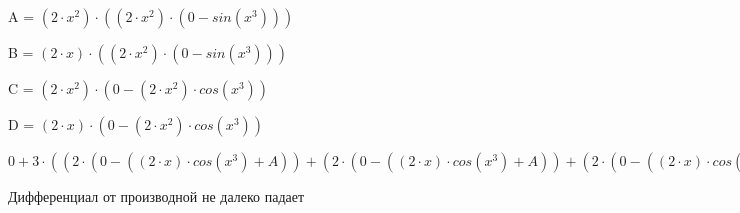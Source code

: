\documentclass[12pt,a4paper,fleqn]{article}
\begin{document}
\begin{center}
A = $(2 \cdot x^{2}) \cdot ((2 \cdot x^{2}) \cdot (0-sin(x^{3})))$\end{center}
\begin{center}
B = $(2 \cdot x) \cdot ((2 \cdot x^{2}) \cdot (0-sin(x^{3})))$\end{center}
\begin{center}
C = $(2 \cdot x^{2}) \cdot (0-(2 \cdot x^{2}) \cdot cos(x^{3}))$\end{center}
\begin{center}
D = $(2 \cdot x) \cdot (0-(2 \cdot x^{2}) \cdot cos(x^{3}))$\end{center}
\begin{center}
$0+3 \cdot ((2 \cdot (0-((2 \cdot x) \cdot cos(x^{3})+A))+(2 \cdot (0-((2 \cdot x) \cdot cos(x^{3})+A))+(2 \cdot (0-((2 \cdot x) \cdot cos(x^{3})+A))+(2 \cdot x) \cdot (0-((2 \cdot cos(x^{3})+B)+(B+(2 \cdot x^{2}) \cdot ((2 \cdot x) \cdot (0-sin(x^{3}))+C)))))))+((2 \cdot (0-((2 \cdot x) \cdot cos(x^{3})+A))+(2 \cdot (0-((2 \cdot x) \cdot cos(x^{3})+A))+(2 \cdot x) \cdot (0-((2 \cdot cos(x^{3})+B)+(B+(2 \cdot x^{2}) \cdot ((2 \cdot x) \cdot (0-sin(x^{3}))+C))))))+((2 \cdot (0-((2 \cdot x) \cdot cos(x^{3})+A))+(2 \cdot x) \cdot (0-((2 \cdot cos(x^{3})+B)+(B+(2 \cdot x^{2}) \cdot ((2 \cdot x) \cdot (0-sin(x^{3}))+C)))))+((2 \cdot x) \cdot (0-((2 \cdot cos(x^{3})+B)+(B+(2 \cdot x^{2}) \cdot ((2 \cdot x) \cdot (0-sin(x^{3}))+C))))+(2 \cdot x^{2}) \cdot (0-((2 \cdot ((2 \cdot x^{2}) \cdot (0-sin(x^{3})))+(2 \cdot ((2 \cdot x^{2}) \cdot (0-sin(x^{3})))+(2 \cdot x) \cdot ((2 \cdot x) \cdot (0-sin(x^{3}))+C)))+((2 \cdot ((2 \cdot x^{2}) \cdot (0-sin(x^{3})))+(2 \cdot x) \cdot ((2 \cdot x) \cdot (0-sin(x^{3}))+C))+((2 \cdot x) \cdot ((2 \cdot x) \cdot (0-sin(x^{3}))+C)+(2 \cdot x^{2}) \cdot ((2 \cdot (0-sin(x^{3}))+D)+(D+(2 \cdot x^{2}) \cdot (0-((2 \cdot x) \cdot cos(x^{3})+A)))))))))))) = 3 \cdot ((2 \cdot (0-((2 \cdot x) \cdot cos(x^{3})+A))+(2 \cdot (0-((2 \cdot x) \cdot cos(x^{3})+A))+(2 \cdot (0-((2 \cdot x) \cdot cos(x^{3})+A))+(2 \cdot x) \cdot (0-((2 \cdot cos(x^{3})+B)+(B+(2 \cdot x^{2}) \cdot ((2 \cdot x) \cdot (0-sin(x^{3}))+C)))))))+((2 \cdot (0-((2 \cdot x) \cdot cos(x^{3})+A))+(2 \cdot (0-((2 \cdot x) \cdot cos(x^{3})+A))+(2 \cdot x) \cdot (0-((2 \cdot cos(x^{3})+B)+(B+(2 \cdot x^{2}) \cdot ((2 \cdot x) \cdot (0-sin(x^{3}))+C))))))+((2 \cdot (0-((2 \cdot x) \cdot cos(x^{3})+A))+(2 \cdot x) \cdot (0-((2 \cdot cos(x^{3})+B)+(B+(2 \cdot x^{2}) \cdot ((2 \cdot x) \cdot (0-sin(x^{3}))+C)))))+((2 \cdot x) \cdot (0-((2 \cdot cos(x^{3})+B)+(B+(2 \cdot x^{2}) \cdot ((2 \cdot x) \cdot (0-sin(x^{3}))+C))))+(2 \cdot x^{2}) \cdot (0-((2 \cdot ((2 \cdot x^{2}) \cdot (0-sin(x^{3})))+(2 \cdot ((2 \cdot x^{2}) \cdot (0-sin(x^{3})))+(2 \cdot x) \cdot ((2 \cdot x) \cdot (0-sin(x^{3}))+C)))+((2 \cdot ((2 \cdot x^{2}) \cdot (0-sin(x^{3})))+(2 \cdot x) \cdot ((2 \cdot x) \cdot (0-sin(x^{3}))+C))+((2 \cdot x) \cdot ((2 \cdot x) \cdot (0-sin(x^{3}))+C)+(2 \cdot x^{2}) \cdot ((2 \cdot (0-sin(x^{3}))+D)+(D+(2 \cdot x^{2}) \cdot (0-((2 \cdot x) \cdot cos(x^{3})+A))))))))))))$\end{center}
Дифференциал от производной не далеко падает\cite{link2}
\end{document}
